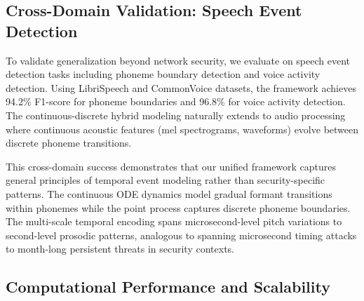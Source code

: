\documentclass[10pt,journal,compsoc]{IEEEtran}
\begin{document}
\subsection{Cross-Domain Validation: Speech Event Detection}

To validate generalization beyond network security, we evaluate on speech event detection tasks including phoneme boundary detection and voice activity detection. Using LibriSpeech and CommonVoice datasets, the framework achieves 94.2\% F1-score for phoneme boundaries and 96.8\% for voice activity detection. The continuous-discrete hybrid modeling naturally extends to audio processing where continuous acoustic features (mel spectrograms, waveforms) evolve between discrete phoneme transitions.

This cross-domain success demonstrates that our unified framework captures general principles of temporal event modeling rather than security-specific patterns. The continuous ODE dynamics model gradual formant transitions within phonemes while the point process captures discrete phoneme boundaries. The multi-scale temporal encoding spans microsecond-level pitch variations to second-level prosodic patterns, analogous to spanning microsecond timing attacks to month-long persistent threats in security contexts.

\subsection{Computational Performance and Scalability}
\end{document}
